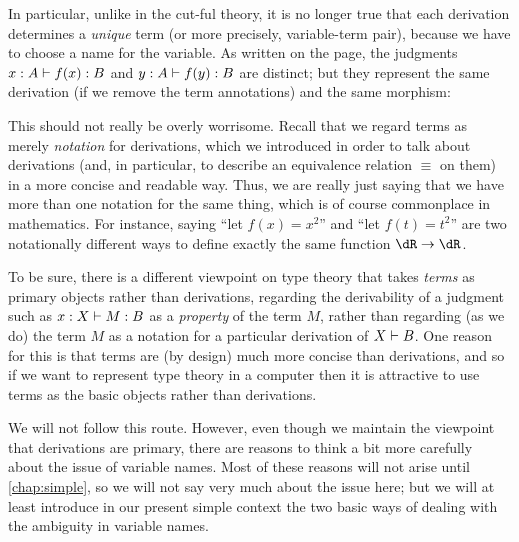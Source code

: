 In particular, unlike in the cut-ful theory, it is no longer true that each derivation determines a \emph{unique} term (or more precisely, variable-term pair), because we have to choose a name for the variable.
As written on the page, the judgments $x:A \vdash f(x):B$ and $y:A \vdash f(y):B$ are distinct; but they represent the same derivation (if we remove the term annotations) and the same morphism:

This should not really be overly worrisome.
Recall that we regard terms as merely \emph{notation} for derivations, which we introduced in order to talk about derivations (and, in particular, to describe an equivalence relation $\equiv$ on them) in a more concise and readable way.
Thus, we are really just saying that we have more than one notation for the same thing, which is of course commonplace in mathematics.
For instance, saying ``let $f(x)=x^2$'' and ``let $f(t)=t^2$'' are two notationally different ways to define exactly the same function $\dR\to\dR$.

To be sure, there is a different viewpoint on type theory that takes \emph{terms} as primary objects rather than derivations, regarding the derivability of a judgment such as $x:X\vdash M:B$ as a \emph{property} of the term $M$, rather than regarding (as we do) the term $M$ as a notation for a particular derivation of $X\vdash B$.
One reason for this is that terms are (by design) much more concise than derivations, and so if we want to represent type theory in a computer then it is attractive to use terms as the basic objects rather than derivations.

We will not follow this route.
However, even though we maintain the viewpoint that derivations are primary, there are reasons to think a bit more carefully about the issue of variable names.
Most of these reasons will not arise until \cref{chap:simple}, so we will not say very much about the issue here; but we will at least introduce in our present simple context the two basic ways of dealing with the ambiguity in variable names.

